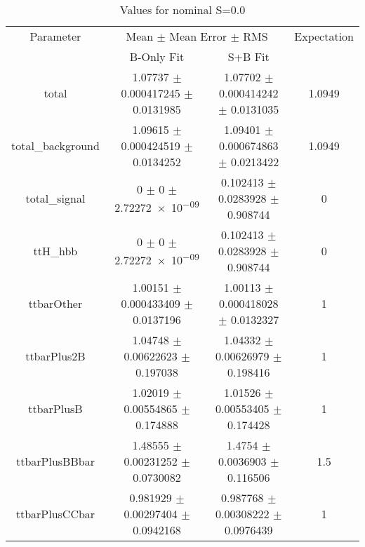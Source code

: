 \begin{table}
\centering
\caption{Values for nominal S=0.0}
\begin{tabular}{cccc}
\toprule
Parameter & \multicolumn{2}{c}{Mean $\pm$ Mean Error $\pm$ RMS} & Expectation\\
 & B-Only Fit & S+B Fit & \\
\midrule
total & \num{1.07737} $\pm$ \num{0.000417245} $\pm$ \num{0.0131985} & \num{1.07702} $\pm$ \num{0.000414242} $\pm$ \num{0.0131035} & \num{1.0949}\\
total\_background & \num{1.09615} $\pm$ \num{0.000424519} $\pm$ \num{0.0134252} & \num{1.09401} $\pm$ \num{0.000674863} $\pm$ \num{0.0213422} & \num{1.0949}\\
total\_signal & \num{0} $\pm$ \num{0} $\pm$ \num{2.72272e-09} & \num{0.102413} $\pm$ \num{0.0283928} $\pm$ \num{0.908744} & \num{0}\\
ttH\_hbb & \num{0} $\pm$ \num{0} $\pm$ \num{2.72272e-09} & \num{0.102413} $\pm$ \num{0.0283928} $\pm$ \num{0.908744} & \num{0}\\
ttbarOther & \num{1.00151} $\pm$ \num{0.000433409} $\pm$ \num{0.0137196} & \num{1.00113} $\pm$ \num{0.000418028} $\pm$ \num{0.0132327} & \num{1}\\
ttbarPlus2B & \num{1.04748} $\pm$ \num{0.00622623} $\pm$ \num{0.197038} & \num{1.04332} $\pm$ \num{0.00626979} $\pm$ \num{0.198416} & \num{1}\\
ttbarPlusB & \num{1.02019} $\pm$ \num{0.00554865} $\pm$ \num{0.174888} & \num{1.01526} $\pm$ \num{0.00553405} $\pm$ \num{0.174428} & \num{1}\\
ttbarPlusBBbar & \num{1.48555} $\pm$ \num{0.00231252} $\pm$ \num{0.0730082} & \num{1.4754} $\pm$ \num{0.0036903} $\pm$ \num{0.116506} & \num{1.5}\\
ttbarPlusCCbar & \num{0.981929} $\pm$ \num{0.00297404} $\pm$ \num{0.0942168} & \num{0.987768} $\pm$ \num{0.00308222} $\pm$ \num{0.0976439} & \num{1}\\
\bottomrule
\end{tabular}
\end{table}